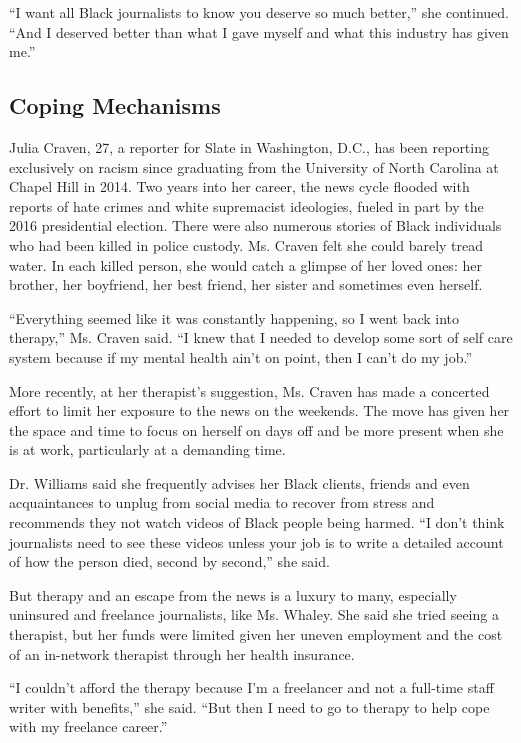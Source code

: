 ``I want all Black journalists to know you deserve so much better,'' she
continued. ``And I deserved better than what I gave myself and what this
industry has given me.''

\hypertarget{coping-mechanisms}{%
\subsection{Coping Mechanisms}\label{coping-mechanisms}}

Julia Craven, 27, a reporter for Slate in Washington, D.C., has been
reporting exclusively on racism since graduating from the University of
North Carolina at Chapel Hill in 2014. Two years into her career, the
news cycle flooded with reports of hate crimes and white supremacist
ideologies, fueled in part by the 2016 presidential election. There were
also numerous stories of Black individuals who had been killed in police
custody. Ms. Craven felt she could barely tread water. In each killed
person, she would catch a glimpse of her loved ones: her brother, her
boyfriend, her best friend, her sister and sometimes even herself.

``Everything seemed like it was constantly happening, so I went back
into therapy,'' Ms. Craven said. ``I knew that I needed to develop some
sort of self care system because if my mental health ain't on point,
then I can't do my job.''

More recently, at her therapist's suggestion, Ms. Craven has made a
concerted effort to limit her exposure to the news on the weekends. The
move has given her the space and time to focus on herself on days off
and be more present when she is at work, particularly at a demanding
time.

Dr. Williams said she frequently advises her Black clients, friends and
even acquaintances to unplug from social media to recover from stress
and recommends they not watch videos of Black people being harmed. ``I
don't think journalists need to see these videos unless your job is to
write a detailed account of how the person died, second by second,'' she
said.

But therapy and an escape from the news is a luxury to many, especially
uninsured and freelance journalists, like Ms. Whaley. She said she tried
seeing a therapist, but her funds were limited given her uneven
employment and the cost of an in-network therapist through her health
insurance.

``I couldn't afford the therapy because I'm a freelancer and not a
full-time staff writer with benefits,'' she said. ``But then I need to
go to therapy to help cope with my freelance career.''

